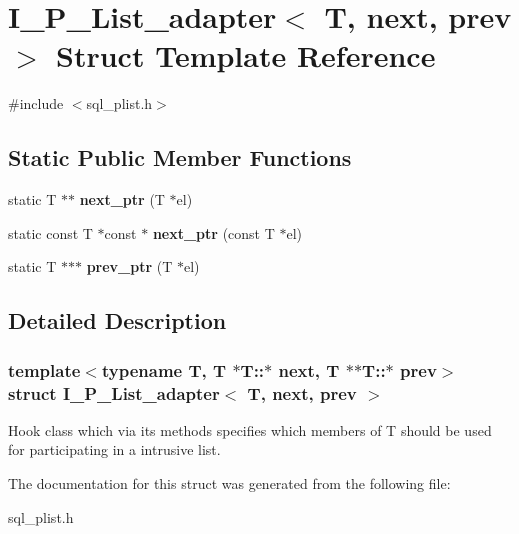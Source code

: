 \hypertarget{structI__P__List__adapter}{}\section{I\+\_\+\+P\+\_\+\+List\+\_\+adapter$<$ T, next, prev $>$ Struct Template Reference}
\label{structI__P__List__adapter}


{\ttfamily \#include $<$sql\+\_\+plist.\+h$>$}

\subsection*{Static Public Member Functions}
\begin{DoxyCompactItemize}
\item 
\mbox{\label{structI__P__List__adapter_a5b8f7cda50881d37a27940e4e1db9eab}} 
static T $\ast$$\ast$ {\bfseries next\+\_\+ptr} (T $\ast$el)
\item 
\mbox{\label{structI__P__List__adapter_a4aca1b93fbdb46c69182316b5fbcaf43}} 
static const T $\ast$const  $\ast$ {\bfseries next\+\_\+ptr} (const T $\ast$el)
\item 
\mbox{\label{structI__P__List__adapter_a70ea6554aec9023ac4e92dbaf144539d}} 
static T $\ast$$\ast$$\ast$ {\bfseries prev\+\_\+ptr} (T $\ast$el)
\end{DoxyCompactItemize}


\subsection{Detailed Description}
\subsubsection*{template$<$typename T, T $\ast$\+T\+::$\ast$ next, T $\ast$$\ast$\+T\+::$\ast$ prev$>$\newline
struct I\+\_\+\+P\+\_\+\+List\+\_\+adapter$<$ T, next, prev $>$}

Hook class which via its methods specifies which members of T should be used for participating in a intrusive list. 

The documentation for this struct was generated from the following file\+:\begin{DoxyCompactItemize}
\item 
sql\+\_\+plist.\+h\end{DoxyCompactItemize}
